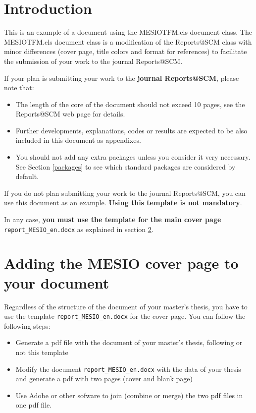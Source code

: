 \documentclass[12,twoside]{MESIOTFM}
\theoremstyle{definition}
\theoremstyle{remark}
\begin{document}
\maketitle

\cleardoublepage

\tableofcontents

\cleardoublepage

\section{Introduction}

This is an example of a document using the MESIOTFM.cls document class. The MESIOTFM.cls document class is a modification of the Reports@SCM class with minor differences (cover page, title colors and format for references) to facilitate the submission of your work to the journal Reports@SCM.

If your plan is submitting your work to the \textbf{journal Reports@SCM}, please note that:
\begin{itemize}
	\item The length of the core of the document should not exceed 10 pages, see the Reports@SCM web page for details.
	\item Further developments, explanations, codes or results are expected to be also included in this document as appendixes.
	\item You should not add any extra packages unless you consider it very necessary. See Section \ref{packages} to see which standard packages  are considered by default. 
\end{itemize} 

If you do not plan submitting your work to the journal  Reports@SCM, you can use this document as an example. \textbf{Using this template is not mandatory}.
 
In any case, \textbf{you must use the template for the main cover page} \texttt{report\_MESIO\_en.docx} as explained in section \ref{sec:coverPage}.

\cleardoublepage

\section{Adding the MESIO cover page to your document}
\label{sec:coverPage}
  
Regardless of the structure of the document of your master's thesis, you have to use the template \texttt{report\_MESIO\_en.docx} for the cover page. You can follow the following steps:
\begin{itemize}
	\item Generate a pdf file with the document of your master's thesis, following or not this template
	\item Modify the document \texttt{report\_MESIO\_en.docx} with the data of your thesis and generate a pdf with two pages (cover and blank page)
	\item Use Adobe or other sofware to join (combine or merge) the two pdf files in one pdf file. 
\end{itemize}
\end{document}
